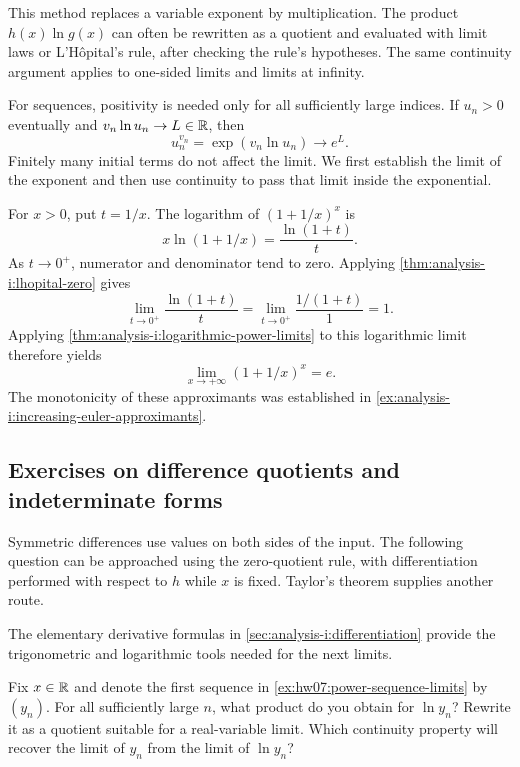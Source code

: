 This method replaces a variable exponent by multiplication. The product
$h(x)\ln g(x)$ can often be rewritten as a quotient and evaluated with
limit laws or L'H\^opital's rule, after checking the rule's hypotheses.
The same continuity argument applies to one-sided limits and limits at
infinity.

For sequences, positivity is needed only for all sufficiently large
indices. If $u_n>0$ eventually and $v_n\ln u_n\to L\in\mathbb{R}$, then
\[
  u_n^{v_n}=\exp(v_n\ln u_n)\longrightarrow e^L.
\]
Finitely many initial terms do not affect the limit. We first establish
the limit of the exponent and then use continuity to pass that limit
inside the exponential.

\begin{example}
  \label{ex:analysis-i:euler-approximant-limit}
  For $x>0$, put $t=1/x$. The logarithm of $(1+1/x)^x$ is
  \[
    x\ln(1+1/x)=\frac{\ln(1+t)}{t}.
  \]
  As $t\to0^+$, numerator and denominator tend to zero. Applying
  \autoref{thm:analysis-i:lhopital-zero} gives
  \[
    \lim_{t\to0^+}\frac{\ln(1+t)}{t}
      =\lim_{t\to0^+}\frac{1/(1+t)}{1}=1.
  \]
  Applying
  \autoref{thm:analysis-i:logarithmic-power-limits} to this logarithmic
  limit therefore yields
  \[
    \lim_{x\to+\infty}(1+1/x)^x=e.
  \]
  The monotonicity of these approximants was established in
  \autoref{ex:analysis-i:increasing-euler-approximants}.
\end{example}

\subsection{Exercises on difference quotients and indeterminate forms}
Symmetric differences use values on both sides of the input. The
following question can be approached using the zero-quotient rule,
with differentiation performed with respect to $h$ while $x$ is fixed.
Taylor's theorem supplies another route.

The elementary derivative formulas in
\autoref{sec:analysis-i:differentiation} provide the trigonometric and
logarithmic tools needed for the next limits.



 Fix $x\in\mathbb{R}$ and denote the first
sequence in \autoref{ex:hw07:power-sequence-limits} by $(y_n)$. For all
sufficiently large $n$, what product do you obtain for $\ln y_n$? Rewrite
it as a quotient suitable for a real-variable limit. Which continuity
property will recover the limit of $y_n$ from the limit of $\ln y_n$?

